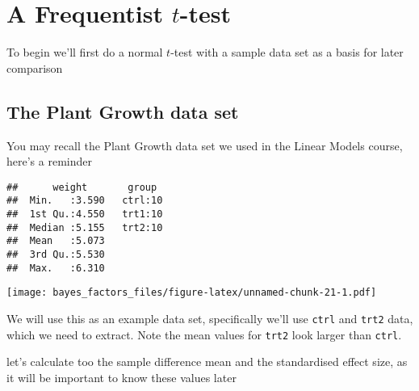 \documentclass[
]{book}
\newenvironment{Shaded}{\begin{snugshade}}{\end{snugshade}}
\newcommand{\KeywordTok}[1]{\textcolor[rgb]{0.13,0.29,0.53}{\textbf{#1}}}
\newcommand{\NormalTok}[1]{#1}
\newcommand{\OperatorTok}[1]{\textcolor[rgb]{0.81,0.36,0.00}{\textbf{#1}}}
\newcommand{\StringTok}[1]{\textcolor[rgb]{0.31,0.60,0.02}{#1}}
\begin{document}
\hypertarget{a-frequentist-t-test}{%
\section{\texorpdfstring{A Frequentist \(t\)-test}{A Frequentist t-test}}\label{a-frequentist-t-test}}

To begin we'll first do a normal \(t\)-test with a sample data set as a basis for later comparison

\hypertarget{the-plant-growth-data-set}{%
\subsection{The Plant Growth data set}\label{the-plant-growth-data-set}}

You may recall the Plant Growth data set we used in the Linear Models course, here's a reminder

\begin{verbatim}
##      weight       group   
##  Min.   :3.590   ctrl:10  
##  1st Qu.:4.550   trt1:10  
##  Median :5.155   trt2:10  
##  Mean   :5.073            
##  3rd Qu.:5.530            
##  Max.   :6.310
\end{verbatim}

\texttt{[image: bayes\_factors\_files/figure-latex/unnamed-chunk-21-1.pdf]}

We will use this as an example data set, specifically we'll use \texttt{ctrl} and \texttt{trt2} data, which we need to extract. Note the mean values for \texttt{trt2} look larger than \texttt{ctrl}.

\begin{Shaded}
\end{Shaded}

let's calculate too the sample difference mean and the standardised effect size, as it will be important to know these values later
\end{document}
